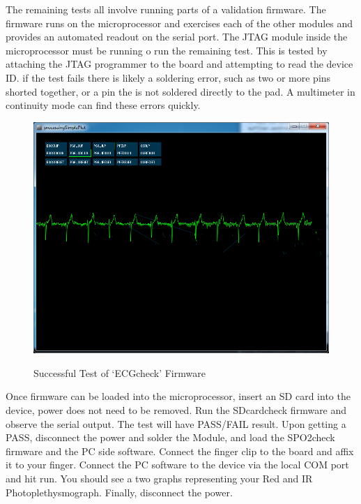 The remaining tests all involve running parts of a validation firmware. The firmware runs on the microprocessor and exercises each of the other modules and provides an automated readout on the serial port. The JTAG module inside the microprocessor must be running o run the remaining test. This is tested by attaching the JTAG programmer to the board and attempting to read the device ID. if the test fails there is likely a soldering error, such as two or more pins shorted together, or a pin the is not soldered directly to the pad. A multimeter in continuity mode can find these errors quickly. 

\begin{figure}[ht]
\begin{center}
	\label{fig:ECG_Test_Pass}
	\includegraphics[angle=0,scale=1,width=1\textwidth]{Images/ECG_processingSketch.png} 
	\caption{Successful Test of `ECGcheck' Firmware}
\end{center}
\end{figure}

Once firmware can be loaded into the microprocessor, insert an SD card into the device, power does not need to be removed. Run the SDcardcheck firmware and observe the serial output. The test will have PASS/FAIL result. Upon getting a PASS, disconnect the power and solder the  Module, and load the SPO2check firmware and the PC side software. Connect the finger clip to the board and affix it to your finger. Connect the PC software to the device via the local COM port and hit run. You should see a two graphs representing your Red and IR Photoplethysmograph. Finally, disconnect the power.


